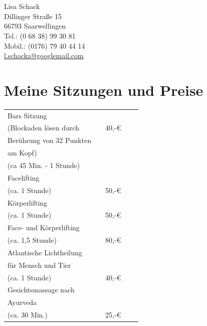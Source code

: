 \documentclass[10pt,foldmark,notumble]{leaflet}
\begin{document}
\section{}%
Lisa Schack\\
Dillinger Straße 15\\
66793 Saarwellingen\\
Tel.: (0 68 38) 99 30 81\\
Mobil.: (0176) 79 40 44 14\\
\href{mailto:l.schacka@googlemail.com}{l.schacka@googlemail.com} \\


\newpage
\section{Meine Sitzungen und Preise}

 \begin{tabular}{p{40mm}llcc}\hline\hline
Bars Sitzung              &     &  \\
(Blockaden lösen durch & & 40,-€ \\
Berührung von 32 Punkten & & \\
am Kopf) & & \\
(ca 45 Min. - 1 Stunde)  &   &  \\
\hline
Facelifting   &   &  \\
(ca. 1 Stunde) & & 50,-€\\
\hline
Körperlifting   &   &  \\
(ca. 1 Stunde) & & 50,-€\\
\hline
Face- und Körperlifting   &   &  \\
(ca. 1,5 Stunde) & & 80,-€\\
 \hline
Atlantische Lichtheilung   &   &  \\
für Mensch und Tier & & \\
(ca. 1 Stunde) & & 40,-€ \\
\hline
Gesichtsmassage nach  &   &  \\
Ayurveda & & \\
(ca. 30 Min.) & & 25,-€ \\
\hline
\end{tabular}


\newpage

\end{document}
